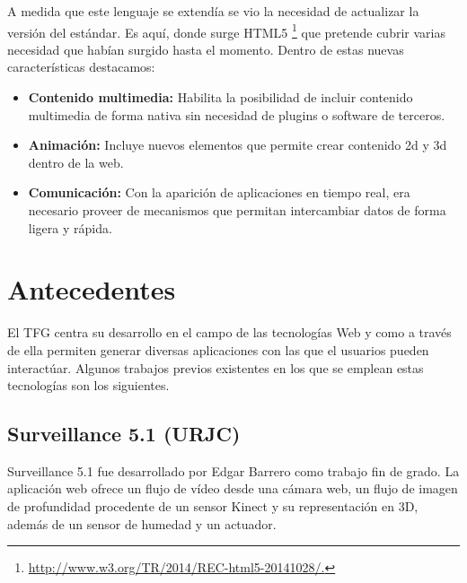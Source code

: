 A medida que este lenguaje se extendía se vio la necesidad de actualizar la versión del estándar. Es aquí, donde surge HTML5 \footnote{\url{http://www.w3.org/TR/2014/REC-html5-20141028/.}} que pretende cubrir varias necesidad que habían surgido hasta el momento. Dentro de estas nuevas características destacamos:
\begin{itemize}
\item \textbf{Contenido multimedia:} Habilita la posibilidad de incluir contenido multimedia de forma nativa sin necesidad de plugins o software de terceros.
\item \textbf{Animación:} Incluye nuevos elementos que permite crear contenido 2d y 3d dentro de la web.
\item \textbf{Comunicación:} Con la aparición de aplicaciones en tiempo real, era necesario proveer de mecanismos que permitan intercambiar datos de forma ligera y rápida. 
\end{itemize}
\section{Antecedentes}
El TFG centra su desarrollo en el campo de las tecnologías Web y como a través de ella permiten generar diversas aplicaciones con las que el usuarios pueden interactúar. Algunos trabajos previos existentes en los que se emplean estas tecnologías son los siguientes.
\subsection*{Surveillance 5.1 (URJC)}
Surveillance 5.1 \cite{TFGsurveillance5.1}\cite{surveillance5.1} fue desarrollado por Edgar Barrero como trabajo fin de grado. La aplicación web ofrece un flujo de vídeo desde una cámara web, un flujo de imagen de profundidad procedente de un sensor Kinect y su representación en 3D, además de un sensor de humedad y un actuador.


